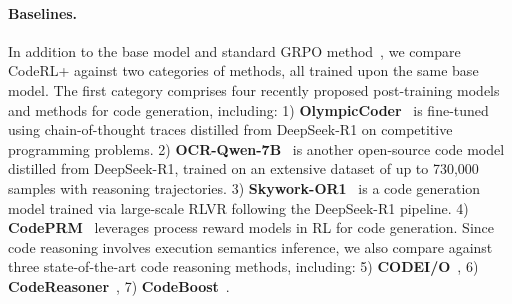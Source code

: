 \documentclass{article}
\DeclareRobustCommand{\ourapproach}{{\sc CodeRL+}\xspace}
\theoremstyle{definition}
\theoremstyle{remark}
\begin{document}
\paragraph{Baselines.}  
In addition to the base model and standard GRPO method~\citep{DeepSeekMath}, we compare \ourapproach against two categories of methods, all trained upon the same base model.
The first category comprises four recently proposed post-training models and methods for code generation, including:
1) \textbf{OlympicCoder}~\citep{openr1} is fine-tuned using chain-of-thought traces distilled from DeepSeek-R1 on competitive programming problems.
2) \textbf{OCR-Qwen-7B}~\citep{ocrqwen} is another open-source code model distilled from DeepSeek-R1, trained on an extensive dataset of up to 730,000 samples with reasoning trajectories.
3) \textbf{Skywork-OR1}~\citep{skywork} is a code generation model trained via large-scale RLVR following the DeepSeek-R1 pipeline.
4) \textbf{CodePRM}~\citep{li2025codeprm} leverages process reward models in RL for code generation.
Since code reasoning involves execution semantics inference, we also compare against three state-of-the-art code reasoning methods, including: 5) \textbf{CODEI/O}~\citep{licodeio}, 6) \textbf{CodeReasoner}~\citep{codereasoner}, 7) \textbf{CodeBoost}~\citep{wang2025codeboost}.
\end{document}
